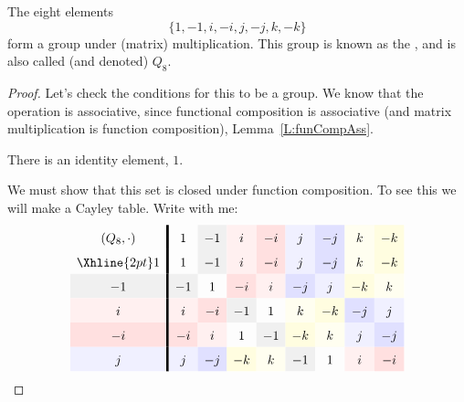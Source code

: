 \documentclass{ximera}
\begin{document}
\begin{example}
  The eight elements
  \[
  \{1,-1,i,-i,j,-j,k,-k\}
  \]
  form a group under (matrix) multiplication. This group is known as
  the , and is also called (and denoted)
  $Q_{8}$.
  \begin{proof}
    Let's check the conditions for this to be a group. We know that
    the operation is associative, since functional composition is
    associative (and matrix multiplication is function composition),
    Lemma~\ref{L:funCompAss}.

    There is an identity element, $1$.
    
    We must show that this set is closed under function composition.
    To see this we will make a Cayley table. Write with me:
    \begin{gather*}
    \renewcommand{\arraystretch}{1.6}
    \begin{array}{c!{\vline width 2pt}cccccccc}
      (Q_8,\cdot) & 1 & -1 \cellcolor{black!6!white} & i \cellcolor{red!6!white} & -i \cellcolor{red!12!white} & j \cellcolor{blue!6!white} & -j \cellcolor{blue!12!white} & k \cellcolor{yellow!6!white} & -k \cellcolor{yellow!12!white} \\ \Xhline{2pt}
      1 & 1 & -1 \cellcolor{black!6!white} & i \cellcolor{red!6!white} & -i \cellcolor{red!12!white} & j \cellcolor{blue!6!white} & -j \cellcolor{blue!12!white} & k \cellcolor{yellow!6!white} & -k \cellcolor{yellow!12!white} \\
      -1 \cellcolor{black!6!white}& -1 \cellcolor{black!6!white} & 1 & -i \cellcolor{red!12!white} & i \cellcolor{red!6!white} & -j \cellcolor{blue!12!white} & j \cellcolor{blue!6!white} & -k \cellcolor{yellow!12!white} & k \cellcolor{yellow!6!white} \\
      i \cellcolor{red!6!white}& i \cellcolor{red!6!white} & -i \cellcolor{red!12!white} & -1 \cellcolor{black!6!white}  & 1 & k \cellcolor{yellow!6!white} & -k \cellcolor{yellow!12!white} & -j \cellcolor{blue!12!white} & j \cellcolor{blue!6!white} \\
      -i \cellcolor{red!12!white}& -i \cellcolor{red!12!white} & i \cellcolor{red!6!white} & 1  & -1  \cellcolor{black!6!white}& -k \cellcolor{yellow!12!white} & k \cellcolor{yellow!6!white} & j \cellcolor{blue!6!white} & -j \cellcolor{blue!12!white} \\
      j \cellcolor{blue!6!white}& j \cellcolor{blue!6!white} & -j \cellcolor{blue!12!white} & -k \cellcolor{yellow!12!white}  & k\cellcolor{yellow!6!white} & -1 \cellcolor{black!6!white} & 1  & i \cellcolor{red!6!white} & -i \cellcolor{red!12!white} \\

\end{array}
\end{gather*}
\end{proof}
\end{example}
\end{document}
